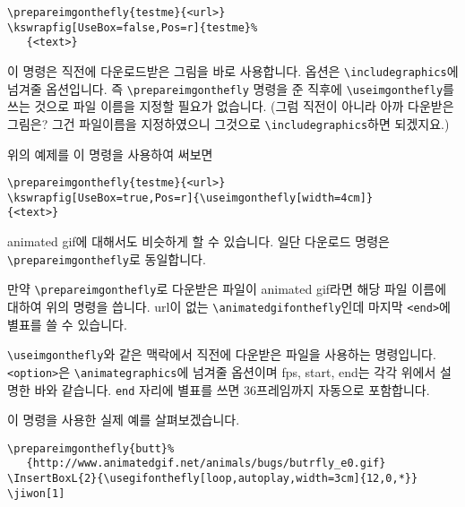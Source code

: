 \documentclass[b5paper,nanum]{oblivoir}
\def\cs#1{\texttt{\textbackslash #1}}
\begin{document}
\begin{verbatim}
\prepareimgonthefly{testme}{<url>}
\kswrapfig[UseBox=false,Pos=r]{testme}%
   {<text>}
\end{verbatim}

\begin{boxedverbatim}
\useimgonthefly[<option>]
\end{boxedverbatim}
이 명령은 직전에 다운로드받은 그림을 바로 사용합니다. 옵션은 \cs{includegraphics}에 넘겨줄 옵션입니다.
즉 \cs{prepareimgonthefly} 명령을 준 직후에 \cs{useimgonthefly}를 쓰는 것으로 파일 이름을 지정할 필요가 없습니다. (그럼 직전이 아니라 아까 다운받은 그림은? 그건 파일이름을 지정하였으니 그것으로 \cs{includegraphics}하면 되겠지요.)

위의 예제를 이 명령을 사용하여 써보면
\begin{verbatim}
\prepareimgonthefly{testme}{<url>}
\kswrapfig[UseBox=true,Pos=r]{\useimgonthefly[width=4cm]}
{<text>}
\end{verbatim}

\medskip

animated gif에 대해서도 비슷하게 할 수 있습니다. 일단 다운로드 명령은 \cs{prepareimgonthefly}로 동일합니다.

\begin{boxedverbatim}
\end{boxedverbatim}

만약 \cs{prepareimgonthefly}로 다운받은 파일이 animated gif라면 해당 파일 이름에 대하여 
위의 명령을 씁니다. url이 없는 \cs{animatedgifonthefly}인데 마지막 \verb|<end>|에 별표를 쓸 수
있습니다.

\begin{boxedverbatim}
\end{boxedverbatim}
\cs{useimgonthefly}와 같은 맥락에서 직전에 다운받은 파일을 사용하는 명령입니다.
\verb|<option>|은 \cs{animategraphics}에 넘겨줄 옵션이며 fps, start, end는 각각 위에서
설명한 바와 같습니다. \verb|end| 자리에 별표를 쓰면 36프레임까지 자동으로 포함합니다.

\bigskip

이 명령을 사용한 실제 예를 살펴보겠습니다.

\begin{verbatim}
\prepareimgonthefly{butt}%
   {http://www.animatedgif.net/animals/bugs/butrfly_e0.gif}
\InsertBoxL{2}{\usegifonthefly[loop,autoplay,width=3cm]{12,0,*}}
\jiwon[1]
\end{verbatim}
\end{document}
